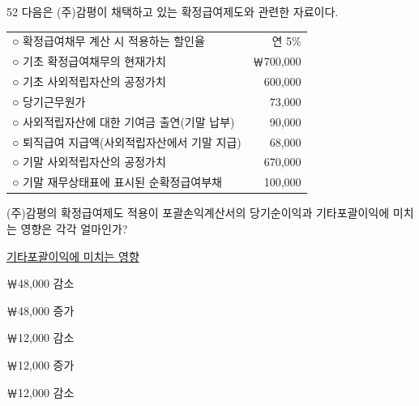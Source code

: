 \begin{question}{52}
다음은 (주)감평이 채택하고 있는 확정급여제도와 관련한 자료이다.
\begin{framedtext}
\begin{tabularx}{\linewidth}{@{}Xr@{}}
○ 확정급여채무 계산 시 적용하는 할인율 & 연 5\% \\
○ 기초 확정급여채무의 현재가치 & ￦700,000 \\
○ 기초 사외적립자산의 공정가치 & 600,000 \\
○ 당기근무원가 & 73,000 \\
○ 사외적립자산에 대한 기여금 출연(기말 납부) & 90,000 \\
○ 퇴직급여 지급액(사외적립자산에서 기말 지급) & 68,000 \\
○ 기말 사외적립자산의 공정가치 & 670,000 \\
○ 기말 재무상태표에 표시된 순확정급여부채 & 100,000 \\
\end{tabularx}
\end{framedtext}
(주)감평의 확정급여제도 적용이 포괄손익계산서의 당기순이익과 기타포괄이익에 미치는 영향은 각각 얼마인가? \par
\hspace{2.5em}\uline{기타포괄이익에 미치는 영향} \par
\begin{choices}
  \item {}￦48,000 감소
  \item {}￦48,000 증가
  \item {}￦12,000 감소
  \item {}￦12,000 증가
  \item {}￦12,000 감소
\end{choices}
\end{question}

